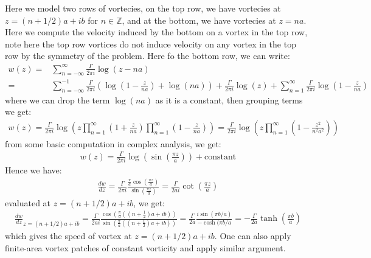\documentclass[11pt]{book}
\theoremstyle{break}
\theoremstyle{break}
\newcommand{\Z}{\mathbb{Z}}
\begin{document}
Here we model two rows of vortecies, on the top row, we have vortecies at $z=(n+1/2)a+ib$ for $n \in \Z$, and at the bottom, we have vortecies at $z = na$. Here we compute the velocity induced by the bottom on a vortex in the top row, note here the top row vortices do not induce velocity on any vortex in the top row by the symmetry of the problem. Here fo the bottom row, we can write:
\begin{align*}
w(z) =& \sum_{n=-\infty}^\infty \frac{\Gamma}{2\pi i}\log(z-na) \\
=& \sum_{n=-\infty}^{-1}\frac{\Gamma}{2\pi i}\left( \log\left( 1-\frac{z}{na}\right) + \log(na)\right)+ \frac{\Gamma}{2\pi i}\log(z) + \sum_{n=1}^\infty \frac{\Gamma}{2\pi i}\log\left( 1-\frac{z}{na}\right)
\end{align*}
where we can drop the term $\log	(na)$ as it is a constant, then grouping terms we get:
\begin{align*}
w(z) = \frac{\Gamma}{2\pi i}\log\left( z \prod_{n=1}^\infty \left( 1+\frac{z}{na}\right) \prod_{n=1}^\infty \left( 1- \frac{z}{na}\right)\right) = \frac{\Gamma}{2\pi i}\log\left( z \prod_{n=1}^\infty \left( 1-\frac{z^2}{n^2a^2}\right)\right)
\end{align*}
from some basic computation in complex analysis, we get:
\begin{align*}
w(z) = \frac{\Gamma}{2\pi i}\log\left(\sin\left( \frac{\pi z}{a}\right) \right) + \text{constant}
\end{align*}
Hence we have:
\begin{align*}
\frac{dw}{dz} = \frac{\Gamma}{2\pi i}\frac{\frac{\pi}{a}\cos\left( \frac{\pi z}{a}\right)}{\sin\left( \frac{\pi z}{a}\right)} = \frac{\Gamma}{2ai}\cot\left( \frac{\pi z}{a}\right)
\end{align*}
evaluated at $z = (n+1/2) a+ib$, we get:
\begin{align*}
\frac{dw}{dz}_{z = (n+1/2) a+ib} = \frac{\Gamma}{2ai}\frac{\cos\left( \frac{\pi}{a}\left(\left( n+\frac{1}{2}\right)a+ib\right) \right)}{\sin\left( \frac{\pi}{a}\left(\left( n+\frac{1}{2}\right)a+ib\right) \right)} = \frac{\Gamma}{2a}\frac{i\sin(\pi b/a)}{-\cosh(\pi b/a} = -\frac{\Gamma}{2a}\tanh\left( \frac{\pi b}{a}\right)
\end{align*}
which gives the speed of vortex at $z = (n+1/2) a+ib$. One can also apply finite-area vortex patches of constant vorticity and apply similar argument.\\
\end{document}
